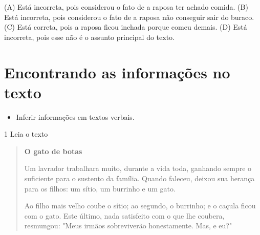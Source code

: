 
(A) Está incorreta, pois considerou o fato de a raposa ter achado comida.
(B) Está incorreta, pois considerou o fato de a raposa não conseguir
sair do buraco.
(C) Está correta, pois a raposa ficou inchada porque comeu demais.
(D) Está incorreta, pois esse não é o assunto principal do texto.

\chapter{Encontrando as informações no texto}


\begin{itemize}
\item
Inferir informações em textos verbais.
\end{itemize}




\num{1} Leia o texto

\begin{quote}
\textbf{O gato de botas}

Um lavrador trabalhara muito, durante a vida toda, ganhando sempre o
suficiente para o sustento da família. Quando faleceu, deixou sua
herança para os filhos: um sítio, um burrinho e um gato.

Ao filho mais velho coube o sítio; ao segundo, o
burrinho; e o caçula ficou com o gato.
Este último, nada satisfeito com o que lhe coubera,
resmungou: "Meus irmãos sobreviverão honestamente. Mas, e eu?"
\end{quote}

